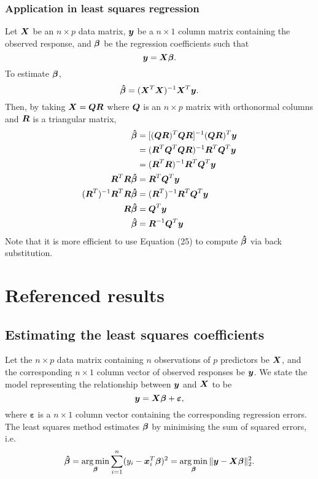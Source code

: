\documentclass[12pt]{article}
\DeclareMathOperator*{\argmin}{arg\,min}
\newcommand{\gbh}{\hat{\gb}}
\newcommand{\bmgb}{\boldsymbol{\gb}}
\newcommand{\bmge}{\boldsymbol{\varepsilon}}
\newcommand{\bmgbh}{\boldsymbol{\gbh}}
\begin{document}
	\subsubsection{Application in least squares regression}
	Let $\boldsymbol{X}$ be an $n\times p$ data matrix, $\boldsymbol{y}$ be a $n\times 1$ column matrix containing the observed response, and $\bmgb$ be the regression coefficients such that
	\begin{equation}
		\bmy=\bmX\bmgb.
	\end{equation}
	To estimate $\bmgb$, 
	\begin{equation}
		\bmgbh=(\bmX^T\bmX)^{-1}\bmX^T\bmy.
	\end{equation}
	Then, by taking $\boldsymbol{X}=\boldsymbol{Q}\boldsymbol{R}$ where $\boldsymbol{Q}$ is an $n\times p$ matrix with orthonormal columns and $\boldsymbol{R}$ is a triangular matrix,
	\begin{align}
		\bmgbh&=[(\bmQ\bmR)^T\bmQ\bmR]^{-1}(\bmQ\bmR)^T\bmy\\
		&=(\bmR^T\bmQ^T\bmQ\bmR)^{-1}\bmR^T\bmQ^T\bmy\\
		&=(\bmR^T\bmR)^{-1}\bmR^T\bmQ^T\bmy\\
		\bmR^T\bmR\bmgbh&=\bmR^T\bmQ^T\bmy\\
		(\bmR^T)^{-1}\bmR^T\bmR\bmgbh&=(\bmR^T)^{-1}\bmR^T\bmQ^T\bmy\\
		\bmR\bmgbh&=\bmQ^T\bmy\\
		\bmgbh&=\bmR^{-1}\bmQ^T\bmy
	\end{align}
	Note that it is more efficient to use Equation (25) to compute $\bmgbh$ via back substitution.
	
	\pagebreak
	\section{Referenced results}
	\subsection{Estimating the least squares coefficients\label{sec:append1}}
	Let the $n\times p$ data matrix containing $n$ observations of $p$ predictors be $\boldsymbol{X}$, and the corresponding $n\times 1$ column vector of observed responses be $\boldsymbol{y}$. We state the model representing the relationship between $\boldsymbol{y}$ and $\boldsymbol{X}$ to be
	$$\bmy=\bmX\bmgb+\bmge,$$
	where $\bmge$ is a $n\times 1$ column vector containing the corresponding regression errors. The least squares method estimates $\bmgb$ by minimising the sum of squared errors, i.e.
	\begin{equation}
		\bmgbh=\argmin_{\bmgb}\sum_{i=1}^{n}(y_i-\bmx_i^T\bmgb)^2=\argmin_{\bmgb}\|\bmy-\bmX\bmgb\|_2^2.
	\end{equation}
	
\end{document}
